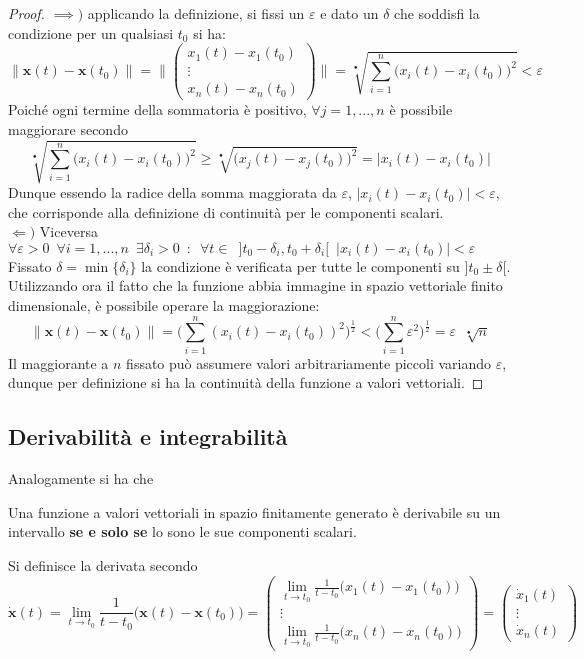 \documentclass[10pt, oneside]{book}
\theoremstyle{plain}
\begin{document}
\begin{proof}
$\implies )$ applicando la definizione, si fissi un $\varepsilon$ e dato un $\delta$ che soddisfi la condizione per un qualsiasi $t_0$ si ha:
\[\|\mathbf{x}(t) - \mathbf{x}(t_0)\| = \big\|\begin{pmatrix}
x_1(t) - x_1(t_0)\\
\vdots\\
x_n(t) - x_n(t_0)
\end{pmatrix}\big\| = \sqrt[•]{\sum\limits_{i=1}^n\big(x_i(t) - x_i(t_0)\big)^2} < \varepsilon\]
Poiché ogni termine della sommatoria è positivo, $\forall j = 1, ..., n$ è possibile maggiorare secondo
\[\sqrt[•]{\sum\limits_{i=1}^n\big(x_i(t) - x_i(t_0)\big)^2} \geq \sqrt[•]{\big(x_j(t) - x_j(t_0)\big)^2} = |x_i(t) - x_i(t_0)|\]
Dunque essendo la radice della somma maggiorata da $\varepsilon$, $\displaystyle |x_i(t) - x_i(t_0)| < \varepsilon$, che corrisponde alla definizione di continuità per le componenti scalari.
\\$\Leftarrow )$ Viceversa $\displaystyle \forall \varepsilon > 0 \enspace \forall i = 1, ..., n \enspace \exists \delta_i > 0 \enspace : \enspace \forall t \in \enspace ]t_0 - \delta_i, t_0 + \delta_i[ \enspace |x_i(t) - x_i(t_0)| < \varepsilon$
\\Fissato $\delta = \min\{\delta_i\}$ la condizione è verificata per tutte le componenti su $]t_0 \pm \delta[$. Utilizzando ora il fatto che la funzione abbia immagine in spazio vettoriale finito dimensionale, è possibile operare la maggiorazione:
\[\|\mathbf{x}(t) - \mathbf{x}(t_0)\| = \big(\sum\limits_{i=1}^n(x_i(t) - x_i(t_0))^2\big)^{\frac{1}{2}} < \big(\sum\limits_{i=1}^n \varepsilon^2\big)^{\frac{1}{2}} = \varepsilon \enspace \sqrt[•]{n}\]
Il maggiorante a $n$ fissato può assumere valori arbitrariamente piccoli variando $\varepsilon$, dunque per definizione si ha la continuità della funzione a valori vettoriali.
\end{proof}

\subsection{Derivabilità e integrabilità}
Analogamente si ha che
\begin{prop}
Una funzione a valori vettoriali in spazio finitamente generato è derivabile su un intervallo \textbf{se e solo se} lo sono le sue componenti scalari.
\end{prop}
Si definisce la derivata secondo
\[\dot{\mathbf{x}}(t) = \lim\limits_{t \rightarrow t_0} \frac{1}{t-t_0}\big(\mathbf{x}(t) - \mathbf{x}(t_0)\big) = \begin{pmatrix}
\displaystyle \lim\limits_{t \rightarrow t_0} \frac{1}{t-t_0}\big(x_1(t) - x_1(t_0)\big)\\
\vdots \\
\displaystyle \lim\limits_{t \rightarrow t_0} \frac{1}{t-t_0}\big(x_n(t) - x_n(t_0)\big)
\end{pmatrix} = \begin{pmatrix}
\dot{x}_1(t)\\
\vdots\\
\dot{x}_n(t)
\end{pmatrix}
\]
\end{document}
